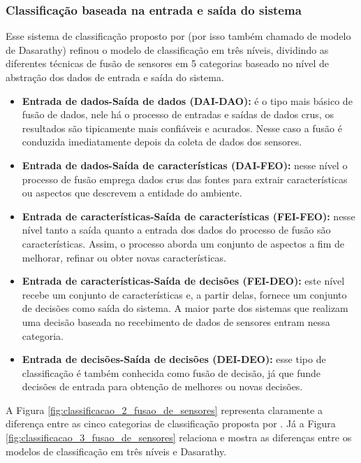 \documentclass[acronym, symbols]{fei}
\begin{document}
			\subsubsection{Classificação baseada na entrada e saída do sistema}
			
				Esse sistema de classificação proposto por \textcite{dasarathy1997sensor} (por isso também chamado de modelo de Dasarathy) refinou o modelo de classificação em três níveis, dividindo as diferentes técnicas de fusão de sensores em 5 categorias baseado no nível de abstração dos dados de entrada e saída do sistema.
				
				\begin{itemize}
					\item \textbf{Entrada de dados-Saída de dados (DAI-DAO):} é o tipo mais básico de fusão de dados, nele há o processo de entradas e saídas de dados crus, os resultados são tipicamente mais confiáveis e acurados. Nesse caso a fusão é conduzida imediatamente depois da coleta de dados dos sensores.
					
					\item \textbf{Entrada de dados-Saída de características (DAI-FEO):} nesse nível o processo de fusão emprega dados crus das fontes para extrair características ou aspectos que descrevem a entidade do ambiente.
					
					\item \textbf{Entrada de características-Saída de características (FEI-FEO):} nesse nível tanto a saída quanto a entrada dos dados do processo de fusão são características. Assim, o processo aborda um conjunto de aspectos a fim de melhorar, refinar ou obter novas características.
					
					\item \textbf{Entrada de características-Saída de decisões (FEI-DEO):} este nível recebe um conjunto de características e, a partir delas, fornece um conjunto de decisões como saída do sistema. A maior parte dos sistemas que realizam uma decisão baseada no recebimento de dados de sensores entram nessa categoria.
					
					\item \textbf{Entrada de decisões-Saída de decisões (DEI-DEO):} esse tipo de classificação é também conhecida como fusão de decisão, já que funde decisões de entrada para obtenção de melhores ou novas decisões.
				\end{itemize}
				
				A Figura \ref{fig:classificacao_2_fusao_de_sensores} representa claramente a diferença entre as cinco categorias de classificação proposta por \textcite{dasarathy1997sensor}. Já a Figura \ref{fig:classificacao_3_fusao_de_sensores} relaciona e mostra as diferenças entre os modelos de classificação em três níveis e Dasarathy.
			
\end{document}
